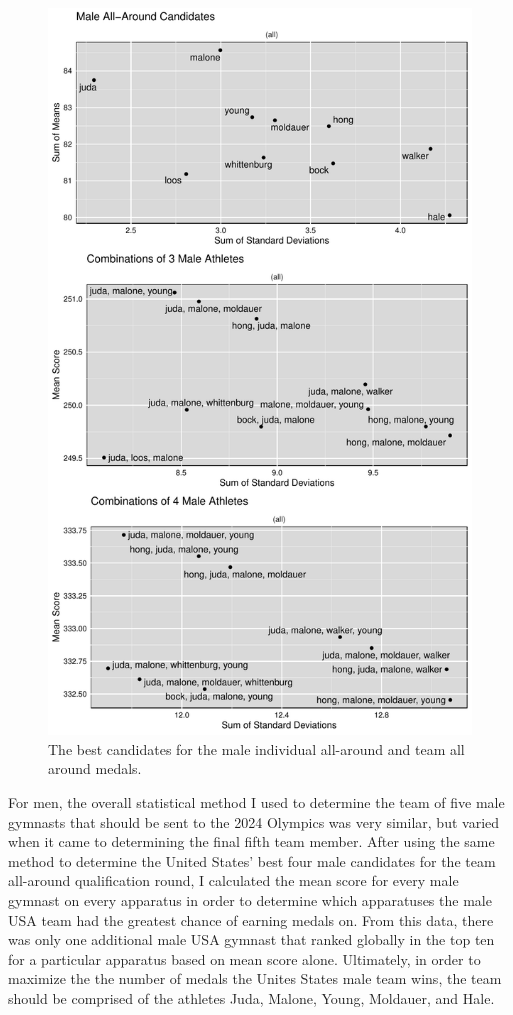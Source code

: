 \documentclass[12pt]{article}
\begin{document}
\begin{figure}
  \centering
  \includegraphics[scale=0.7]{FinalMaleAllAroundPlot.pdf}
  \caption{The best candidates for the male individual all-around and team all around medals.}
  \label{fig:MAA}
\end{figure}


For men, the overall statistical method I used to determine the team of five male gymnasts that should be sent 
to the 2024 Olympics was very similar, but varied when it came to determining the final fifth team member. After 
using the same method to determine the United States' best four male candidates for the team all-around qualification 
round, I calculated the mean score for every male gymnast on every apparatus in order to determine which apparatuses 
the male USA team had the greatest chance of earning medals on. From this data, there was only one additional male 
USA gymnast that ranked globally in the top ten for a particular apparatus based on mean score alone. 
Ultimately, in order to maximize the the number of medals the Unites States male team wins, the team should be comprised  
of the athletes Juda, Malone, Young, Moldauer, and Hale.



\end{document}
